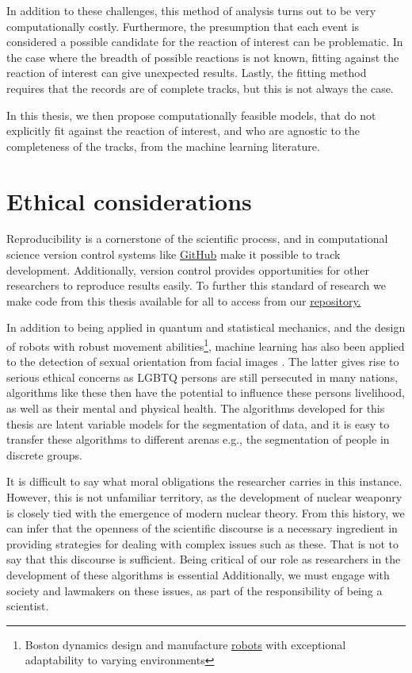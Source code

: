 In addition to these challenges, this method of analysis turns out to be very computationally costly. Furthermore, the presumption that each event is considered a possible candidate for the reaction of interest can be problematic. In the case where the breadth of possible reactions is not known, fitting against the reaction of interest can give unexpected results. Lastly, the fitting method requires that the records are of complete tracks, but this is not always the case.

In this thesis, we then propose computationally feasible models, that do not explicitly fit against the reaction of interest, and who are agnostic to the completeness of the tracks, from the machine learning literature.

\section{Ethical considerations}

Reproducibility is a cornerstone of the scientific process, and in computational science version control systems like \href{https://GitHub.com/}{GitHub} make it possible to track development. Additionally, version control provides opportunities for other researchers to reproduce results easily. To further this standard of research we make code from this thesis available for all to access from our \href{https://GitHub.com/ATTPC/VAE-event-classification}{repository.} 

In addition to being applied in quantum and statistical mechanics, and the design of robots with robust movement abilities\footnote{Boston dynamics design and manufacture \href{https://www.youtube.com/watch?v=LikxFZZO2sk}{robots} with exceptional adaptability to varying environments}, machine learning has also been applied to the detection of sexual orientation from facial images \cite{Wang2018}. The latter gives rise to serious ethical concerns as LGBTQ persons are still persecuted in many nations, algorithms like these then have the potential to influence these persons livelihood, as well as their mental and physical health. The algorithms developed for this thesis are latent variable models for the segmentation of data, and it is easy to transfer these algorithms to different arenas e.g., the segmentation of people in discrete groups.

It is difficult to say what moral obligations the researcher carries in this instance. However, this is not unfamiliar territory, as the development of nuclear weaponry is closely tied with the emergence of modern nuclear theory. From this history, we can infer that the openness of the scientific discourse is a necessary ingredient in providing strategies for dealing with complex issues such as these. That is not to say that this discourse is sufficient.  Being critical of our role as researchers in the development of these algorithms is essential Additionally, we must engage with society and lawmakers on these issues, as part of the responsibility of being a scientist. 


